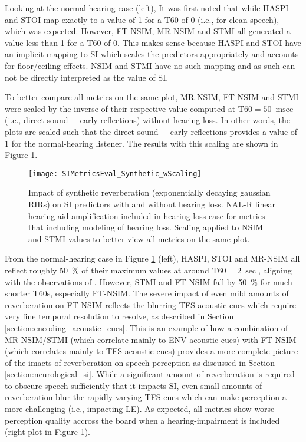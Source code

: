 Looking at the normal-hearing case (left), It was first noted that while HASPI and STOI map exactly to a value of 1 for a T60 of \qty{0}{\sec} (i.e., for clean speech), which was expected. However, FT-NSIM, MR-NSIM and STMI all generated a value less than 1 for a T60 of \qty{0}{\sec}. This makes sense because HASPI and STOI have an implicit mapping to SI which scales the predictors appropriately and accounts for floor/ceiling effects. NSIM and STMI have no such mapping and as such can not be directly interpreted as the value of SI.

To better compare all metrics on the same plot, MR-NSIM, FT-NSIM and STMI were scaled by the inverse of their respective value computed at $\mathrm{T60} = \qty{50}{\milli\sec}$ (i.e., direct sound + early reflections) without hearing loss. In other words, the plots are scaled such that the direct sound + early reflections provides a value of 1 for the normal-hearing listener. The results with this scaling are shown in Figure \ref{fig:SIMetricsEval_Synthetic_wScaling}.

\begin{figure}[H]
	\texttt{[image: SIMetricsEval\_Synthetic\_wScaling]}
	\centering
	\caption[Impact of synthetic reverberation on proposed SI predictors (After scaling)]{Impact of synthetic reverberation (exponentially decaying gaussian RIRs) on SI predictors with and without hearing loss. NAL-R linear hearing aid amplification included in hearing loss case for metrics that including modeling of hearing loss. Scaling applied to NSIM and STMI values to better view all metrics on the same plot.}
	\label{fig:SIMetricsEval_Synthetic_wScaling}
\end{figure}

From the normal-hearing case in Figure \ref{fig:SIMetricsEval_Synthetic_wScaling} (left), HASPI, STOI and MR-NSIM all reflect roughly \qty{50}{\percent} of their maximum values at around $\mathrm{T60} = \qty{2}{\sec}$, aligning with the observations of \cite{george2010measuring}. However, STMI and FT-NSIM fall by \qty{50}{\percent} for much shorter T60s, especially FT-NSIM. The severe impact of even mild amounts of reverberation on FT-NSIM reflects the blurring TFS acoustic cues which require very fine temporal resolution to resolve, as described in Section \ref{section:encoding_acoustic_cues}. This is an example of how a combination of MR-NSIM/STMI (which correlate mainly to ENV acoustic cues) with FT-NSIM (which correlates mainly to TFS acoustic cues) provides a more complete picture of the imacts of reverberation on speech perception as discussed in Section \ref{section:neurological_si}. While a significant amount of reverberation is required to obscure speech sufficiently that it impacts SI, even small amounts of reverberation blur the rapidly varying TFS cues which can make perception a more challenging (i.e., impacting LE). As expected, all metrics show worse perception quality accross the board when a hearing-impairment is included (right plot in Figure \ref{fig:SIMetricsEval_Synthetic_wScaling}).

